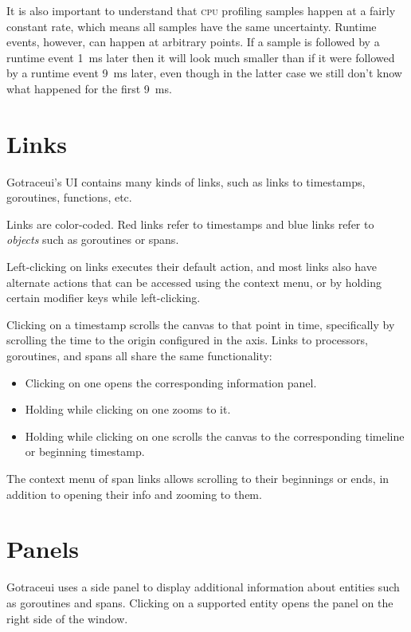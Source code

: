 \documentclass[10pt,letterpaper,oneside,openany,english]{memoir}
\newcommand{\shortcut}{\ctrl{} or \cmdmac}
\begin{document}
It is also important to understand that \textsc{cpu} profiling samples happen at a fairly constant rate, which means all samples have the same uncertainty.
Runtime events, however, can happen at arbitrary points.
If a sample is followed by a runtime event \qty{1}{\milli\second} later then it will look much smaller than if it were followed by a runtime event \qty{9}{\milli\second} later,
even though in the latter case we still don't know what happened for the first \qty{9}{\milli\second}.

\section{Links}

Gotraceui's UI contains many kinds of links, such as links to timestamps, goroutines, functions, etc.

Links are color-coded. Red links refer to timestamps and blue links refer to \emph{objects} such as goroutines or spans.

Left-clicking on links executes their default action,
and most links also have alternate actions that can be accessed using the context menu,
or by holding certain modifier keys while left-clicking.

Clicking on a timestamp scrolls the canvas to that point in time, specifically by scrolling the time to the origin configured in the axis.
Links to processors, goroutines, and spans all share the same functionality:
\begin{itemize}
\item Clicking on one opens the corresponding information panel.
\item Holding \keys{\shortcut} while clicking on one zooms to it.
\item Holding \keys{\shift} while clicking on one scrolls the canvas to the corresponding timeline or beginning timestamp.
\end{itemize}

The context menu of span links allows scrolling to their beginnings or ends, in addition to opening their info and zooming to them.

\section{Panels}\label{panels}

Gotraceui uses a side panel to display additional information about entities such as goroutines and spans.
Clicking on a supported entity opens the panel on the right side of the window.
\end{document}
